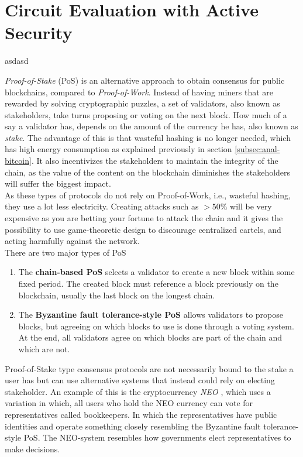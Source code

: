 \chapter{Circuit Evaluation with Active Security}
\label{cha:CEPS}

asdasd

\iffalse
\emph{Proof-of-Stake} (PoS) \cite{pos} is an alternative approach to obtain consensus for public blockchains, compared to \emph{Proof-of-Work}. Instead of having miners that are rewarded by solving cryptographic puzzles, a set of validators, also known as stakeholders, take turns proposing or voting on the next block. How much of a say a validator has, depends on the amount of the currency he has, also known as \emph{stake}. The advantage of this is that wasteful hashing is no longer needed, which has high energy consumption as explained previously in section \ref{subsec:anal-bitcoin}. It also incentivizes the stakeholders to maintain the integrity of the chain, as the value of the content on the blockchain diminishes the stakeholders will suffer the biggest impact.\\

As these types of protocols do not rely on Proof-of-Work, i.e., wasteful hashing, they use a lot less electricity. Creating attacks such as $>50\%$ will be very expensive as you are betting your fortune to attack the chain and it gives the possibility to use game-theoretic design to discourage centralized cartels, and acting harmfully against the network.\\

There are two major types of PoS \cite{eth-pos}
\begin{enumerate}
    \item The \textbf{chain-based PoS} selects a validator to create a new block within some fixed period. The created block must reference a block previously on the blockchain, usually the last block on the longest chain.
    
    \item The \textbf{Byzantine fault tolerance-style PoS} allows validators to propose blocks, but agreeing on which blocks to use is done through a voting system. At the end, all validators agree on which blocks are part of the chain and which are not.
\end{enumerate}

Proof-of-Stake type consensus protocols are not necessarily bound to the stake a user has but can use alternative systems that instead could rely on electing stakeholder. An example of this is the cryptocurrency \emph{NEO} \cite{neo}, which uses a variation in which, all users who hold the NEO currency can vote for representatives called bookkeepers. In which the representatives have public identities and operate something closely resembling the Byzantine fault tolerance-style PoS. The NEO-system resembles how governments elect representatives to make decisions.\\

